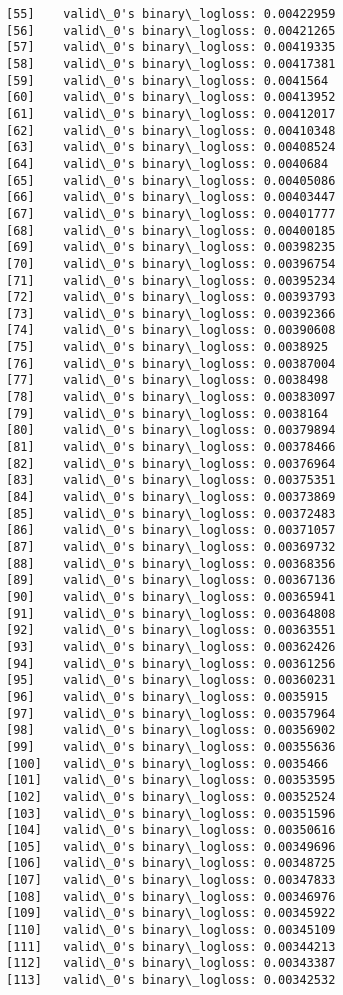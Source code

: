 \documentclass[11pt]{article}
\begin{document}
\begin{Verbatim}[commandchars=\\\{\}]
[55]	valid\_0's binary\_logloss: 0.00422959
[56]	valid\_0's binary\_logloss: 0.00421265
[57]	valid\_0's binary\_logloss: 0.00419335
[58]	valid\_0's binary\_logloss: 0.00417381
[59]	valid\_0's binary\_logloss: 0.0041564
[60]	valid\_0's binary\_logloss: 0.00413952
[61]	valid\_0's binary\_logloss: 0.00412017
[62]	valid\_0's binary\_logloss: 0.00410348
[63]	valid\_0's binary\_logloss: 0.00408524
[64]	valid\_0's binary\_logloss: 0.0040684
[65]	valid\_0's binary\_logloss: 0.00405086
[66]	valid\_0's binary\_logloss: 0.00403447
[67]	valid\_0's binary\_logloss: 0.00401777
[68]	valid\_0's binary\_logloss: 0.00400185
[69]	valid\_0's binary\_logloss: 0.00398235
[70]	valid\_0's binary\_logloss: 0.00396754
[71]	valid\_0's binary\_logloss: 0.00395234
[72]	valid\_0's binary\_logloss: 0.00393793
[73]	valid\_0's binary\_logloss: 0.00392366
[74]	valid\_0's binary\_logloss: 0.00390608
[75]	valid\_0's binary\_logloss: 0.0038925
[76]	valid\_0's binary\_logloss: 0.00387004
[77]	valid\_0's binary\_logloss: 0.0038498
[78]	valid\_0's binary\_logloss: 0.00383097
[79]	valid\_0's binary\_logloss: 0.0038164
[80]	valid\_0's binary\_logloss: 0.00379894
[81]	valid\_0's binary\_logloss: 0.00378466
[82]	valid\_0's binary\_logloss: 0.00376964
[83]	valid\_0's binary\_logloss: 0.00375351
[84]	valid\_0's binary\_logloss: 0.00373869
[85]	valid\_0's binary\_logloss: 0.00372483
[86]	valid\_0's binary\_logloss: 0.00371057
[87]	valid\_0's binary\_logloss: 0.00369732
[88]	valid\_0's binary\_logloss: 0.00368356
[89]	valid\_0's binary\_logloss: 0.00367136
[90]	valid\_0's binary\_logloss: 0.00365941
[91]	valid\_0's binary\_logloss: 0.00364808
[92]	valid\_0's binary\_logloss: 0.00363551
[93]	valid\_0's binary\_logloss: 0.00362426
[94]	valid\_0's binary\_logloss: 0.00361256
[95]	valid\_0's binary\_logloss: 0.00360231
[96]	valid\_0's binary\_logloss: 0.0035915
[97]	valid\_0's binary\_logloss: 0.00357964
[98]	valid\_0's binary\_logloss: 0.00356902
[99]	valid\_0's binary\_logloss: 0.00355636
[100]	valid\_0's binary\_logloss: 0.0035466
[101]	valid\_0's binary\_logloss: 0.00353595
[102]	valid\_0's binary\_logloss: 0.00352524
[103]	valid\_0's binary\_logloss: 0.00351596
[104]	valid\_0's binary\_logloss: 0.00350616
[105]	valid\_0's binary\_logloss: 0.00349696
[106]	valid\_0's binary\_logloss: 0.00348725
[107]	valid\_0's binary\_logloss: 0.00347833
[108]	valid\_0's binary\_logloss: 0.00346976
[109]	valid\_0's binary\_logloss: 0.00345922
[110]	valid\_0's binary\_logloss: 0.00345109
[111]	valid\_0's binary\_logloss: 0.00344213
[112]	valid\_0's binary\_logloss: 0.00343387
[113]	valid\_0's binary\_logloss: 0.00342532

\end{Verbatim}
\end{document}
